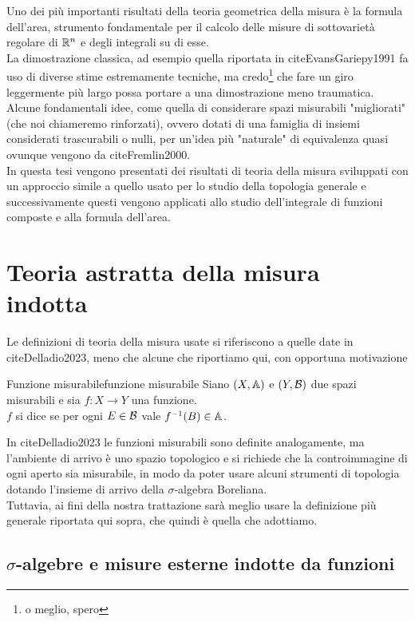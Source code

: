 \documentclass[openany]{book}
\begin{document}
Uno dei più importanti risultati della teoria geometrica della misura è la formula dell'area, strumento fondamentale per il calcolo delle misure di sottovarietà regolare di $\mathbb{R}^n$ e degli integrali su di esse.\\
La dimostrazione classica, ad esempio quella riportata in cite{EvansGariepy1991} fa uso di diverse stime estremamente tecniche, ma credo\footnote{o meglio, spero} che fare un giro leggermente più largo possa portare a una dimostrazione meno traumatica.\\
Alcune fondamentali idee, come quella di considerare spazi misurabili "migliorati" (che noi chiameremo rinforzati), ovvero dotati di una famiglia di insiemi considerati trascurabili o nulli, per un'idea più "naturale" di equivalenza quasi ovunque vengono da cite{Fremlin2000}.\\
In questa tesi vengono presentati dei risultati di teoria della misura sviluppati con un approccio simile a quello usato per lo studio della topologia generale e successivamente questi vengono applicati allo studio dell'integrale di funzioni composte e alla formula dell'area.

\section{Teoria astratta della misura indotta}

Le definizioni di teoria della misura usate si riferiscono a quelle date in cite{Delladio2023}, meno che alcune che riportiamo qui, con opportuna motivazione

\begin{definition}{Funzione misurabile}{funzione misurabile}
    Siano $(X,\mathbb{A})$ e $(Y,\mathcal{B})$ due spazi misurabili e sia $f : X\to Y$ una funzione.\\
    $f$ si dice  se per ogni $E \in \mathcal{B}$ vale $f^{-1}(B) \in \mathbb{A}$.
\end{definition}

In cite{Delladio2023} le funzioni misurabili sono definite analogamente, ma l'ambiente di arrivo è uno spazio topologico e si richiede che la controimmagine di ogni aperto sia misurabile, in modo da poter usare alcuni strumenti di topologia dotando l'insieme di arrivo della $\sigma$-algebra Boreliana.\\
Tuttavia, ai fini della nostra trattazione sarà meglio usare la definizione più generale riportata qui sopra, che quindi è quella che adottiamo.

\subsection{$\sigma$-algebre e misure esterne indotte da funzioni}
\end{document}
